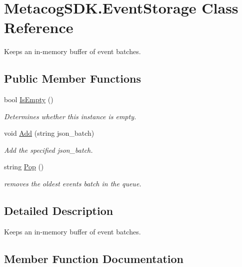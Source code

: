 \hypertarget{classMetacogSDK_1_1EventStorage}{}\section{Metacog\+S\+D\+K.\+Event\+Storage Class Reference}
\label{classMetacogSDK_1_1EventStorage}


Keeps an in-\/memory buffer of event batches.  


\subsection*{Public Member Functions}
\begin{DoxyCompactItemize}
\item 
bool \hyperlink{classMetacogSDK_1_1EventStorage_a8443cd6b97e64df655860fccfa7a17f1}{Is\+Empty} ()
\begin{DoxyCompactList}\small\item\em Determines whether this instance is empty. \end{DoxyCompactList}\item 
void \hyperlink{classMetacogSDK_1_1EventStorage_a748d213bc1101abcd387fa60fef04d5f}{Add} (string json\+\_\+batch)
\begin{DoxyCompactList}\small\item\em Add the specified json\+\_\+batch. \end{DoxyCompactList}\item 
string \hyperlink{classMetacogSDK_1_1EventStorage_ad54c17596088fffb5f47f644fae2388e}{Pop} ()
\begin{DoxyCompactList}\small\item\em removes the oldest events batch in the queue. \end{DoxyCompactList}\end{DoxyCompactItemize}


\subsection{Detailed Description}
Keeps an in-\/memory buffer of event batches. 



\subsection{Member Function Documentation}
